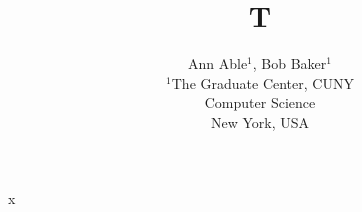 \documentclass{article}
\begin{document}
\title{T}
\author{Ann Able$^{1}$, Bob Baker$^{1}$\\ $^1$The Graduate Center, CUNY\\ Computer Science\\ New York, USA}
\maketitle
x
\end{document}

